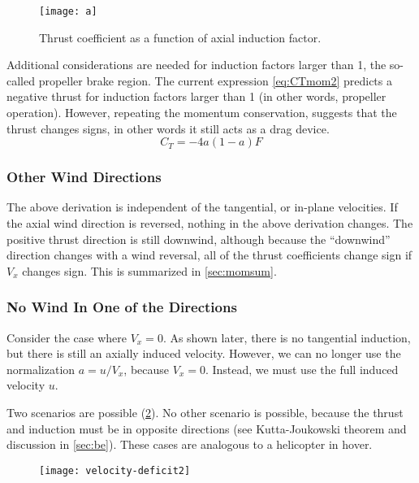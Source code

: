 \begin{figure}[htbp]
\centering
\texttt{[image: a]}
\caption{Thrust coefficient as a function of axial induction factor.}
\label{fig:a}
\end{figure}

Additional considerations are needed for induction factors larger than 1, the so-called propeller brake region.  The current expression \cref{eq:CTmom2} predicts a negative thrust for induction factors larger than 1 (in other words, propeller operation).  However, repeating the momentum conservation, suggests that the thrust changes signs, in other words it still acts as a drag device.
\begin{equation}
    C_T = - 4 a (1 - a) F
    \label{eq:CTpb}
\end{equation}



\subsubsection{Other Wind Directions}

The above derivation is independent of the tangential, or in-plane velocities.  If the axial wind direction is reversed, nothing in the above derivation changes.  The positive thrust direction is still downwind, although because the ``downwind'' direction changes with a wind reversal, all of the thrust coefficients change sign if $V_x$ changes sign.  This is summarized in \cref{sec:momsum}.

\subsubsection{No Wind In One of the Directions}

Consider the case where $V_x = 0$.  As shown later, there is no tangential induction, but there is still an axially induced velocity.  However, we can no longer use the normalization $a = u/V_x$, because $V_x = 0$.  Instead, we must use the full induced velocity $u$.

Two scenarios are possible (\cref{fig:velocity-deficit2}).  No other scenario is possible, because the thrust and induction must be in opposite directions (see Kutta-Joukowski theorem and discussion in \cref{sec:be}).  These cases are analogous to a helicopter in hover.
\begin{figure}[htbp]
\centering
\texttt{[image: velocity-deficit2]}
\caption{}
\label{fig:velocity-deficit2}
\end{figure}


